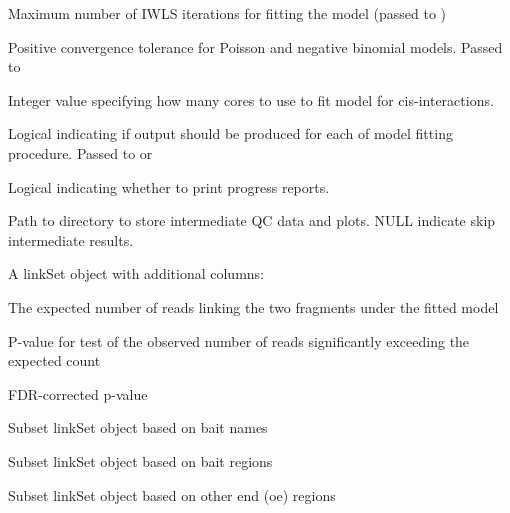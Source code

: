 \documentclass[letterpaper]{book}
\begin{document}
\begin{Arguments}
\begin{ldescription}
\item[\code{maxit}] Maximum number of IWLS iterations for fitting the model (passed to )

\item[\code{epsilon}] Positive convergence tolerance for Poisson and negative binomial models. Passed to 

\item[\code{cores}] Integer value specifying how many cores to use to fit model for cis-interactions.

\item[\code{trace}] Logical indicating if output should be produced for each of model fitting procedure. Passed to  or 

\item[\code{verbose}] Logical indicating whether to print progress reports.

\item[\code{interim.data.dir}] Path to directory to store intermediate QC data and plots. NULL indicate skip intermediate results.
\end{ldescription}
\end{Arguments}
%
\begin{Value}
A linkSet object with additional columns:
\begin{ldescription}
\item[\code{expected}] The expected number of reads linking the two fragments under the fitted model
\item[\code{p.value}] P-value for test of the observed number of reads significantly exceeding the expected count
\item[\code{q.value}] FDR-corrected p-value
\end{ldescription}
\end{Value}
%
\begin{Description}
Subset linkSet object based on bait names

Subset linkSet object based on bait regions

Subset linkSet object based on other end (oe) regions
\end{Description}
\end{document}
